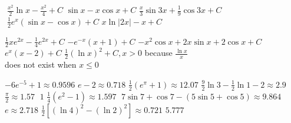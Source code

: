 \begin{Answer}[ref={exIBP}]
\Question %
\begin{tasks}
	\task $\;\frac{x^{2}}{2} \ln  x -\frac{x^{2}}{4} +C$
	\task $\sin  x -x \cos  x +C$ 
	\task $\frac{x}{3} \sin  3 x +\frac{1}{9} \cos  3 x +C$ 
	\task $\;\frac{1}{2} e^{x} \left (\sin  x -\cos  x\right ) +C$ 
	\task $x\ln \left \vert 2 x\right \vert  -x +C$ 
\end{tasks}

\Question %

\Question %
\begin{tasks}
	\task $\frac{1}{2} x e^{2 x} -\frac{1}{4} e^{2 x} +C$
	\task $ -e^{ -x} \left (x +1\right ) +C$ 
	\task $ -x^{2} \cos  x +2 x \sin  x +2 \cos  x +C$ 
	\task $e^{x} \left (x -2\right ) +C$
	\task $\frac{1}{2} \left (\ln  x\right )^{2} +C ,x >0$ because $\frac{\ln  x}{x}$ \\
	does not exist when $x \leq 0$ 
\end{tasks}

\Question %
\begin{tasks}
	\task $ -6 e^{ -5} +1 \approx 0.9596$
	\task $e -2 \approx 0.718$ 
	\task $\frac{1}{2} \left (e^{\pi } +1\right ) \approx 12.07$ 
	\task $\frac{9}{2} \ln  3 -\frac{1}{2} \ln  1 -2 \approx 2.9$ 
	\task $\frac{\pi }{2} \approx 1.57$ 
	\task $\;1$ 
	\task $\frac{1}{4} \left (e^{2} -1\right ) \approx 1.597$ 
	\task $\;7 \sin  7 +\cos  7 -\left (5 \sin  5 +\cos  5\right ) \approx 9.864$
	\task $e \approx 2.718$ 
	\task $\frac{1}{2} \left [\left (\ln  4\right )^{2} -\left (\ln  2\right )^{2}\right ] \approx 0.721$ 
	\task $5.777$ 
\end{tasks}	
	
\end{Answer}%

